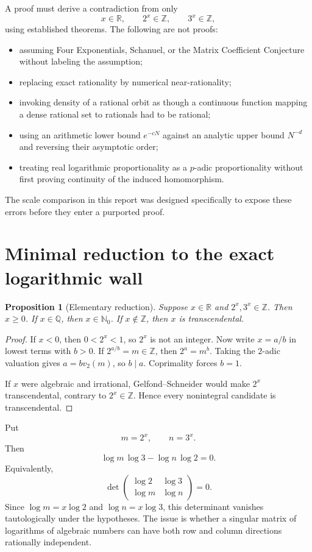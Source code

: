 \documentclass[11pt]{article}
\newtheorem{proposition}[theorem]{Proposition}
\theoremstyle{definition}
\theoremstyle{remark}
\newcommand{\Q}{\mathbb Q}
\newcommand{\R}{\mathbb R}
\newcommand{\Z}{\mathbb Z}
\newcommand{\Nzero}{\mathbb N_0}
\begin{document}
A proof must derive a contradiction from only
\[
  x\in\R,\qquad 2^x\in\Z,\qquad 3^x\in\Z,
\]
using established theorems.  The following are not proofs:

\begin{itemize}[leftmargin=2em]
\item assuming Four Exponentials, Schanuel, or the Matrix Coefficient Conjecture without
      labeling the assumption;
\item replacing exact rationality by numerical near-rationality;
\item invoking density of a rational orbit as though a continuous function mapping a dense
      rational set to rationals had to be rational;
\item using an arithmetic lower bound $e^{-cN}$ against an analytic upper bound $N^{-d}$ and
      reversing their asymptotic order;
\item treating real logarithmic proportionality as a $p$-adic proportionality without first
      proving continuity of the induced homomorphism.
\end{itemize}

The scale comparison in this report was designed specifically to expose these errors before
they enter a purported proof.

\section{Minimal reduction to the exact logarithmic wall}
\label{sec:baseline}

\begin{proposition}[Elementary reduction]\label{prop:elementary}
Suppose $x\in\R$ and $2^x,3^x\in\Z$.  Then $x\ge0$.  If $x\in\Q$, then $x\in\Nzero$.
If $x\notin\Z$, then $x$ is transcendental.
\end{proposition}

\begin{proof}
If $x<0$, then $0<2^x<1$, so $2^x$ is not an integer.  Now write
$x=a/b$ in lowest terms with $b>0$.  If $2^{a/b}=m\in\Z$, then
$2^a=m^b$.  Taking the $2$-adic valuation gives
$a=bv_2(m)$, so $b\mid a$.  Coprimality forces $b=1$.

If $x$ were algebraic and irrational, Gelfond--Schneider would make $2^x$
transcendental, contrary to $2^x\in\Z$.  Hence every nonintegral candidate is
transcendental.
\end{proof}

Put
\[
  m=2^x,\qquad n=3^x.
\]
Then
\begin{equation}
  \log m\,\log 3-\log n\,\log 2=0.
  \label{eq:logdet}
\end{equation}
Equivalently,
\[
 \det\begin{pmatrix}
 \log2&\log3\\
 \log m&\log n
 \end{pmatrix}=0.
\]
Since $\log m=x\log2$ and $\log n=x\log3$, this determinant vanishes tautologically under
the hypotheses.  The issue is whether a singular matrix of logarithms of algebraic numbers
can have both row and column directions rationally independent.
\end{document}
